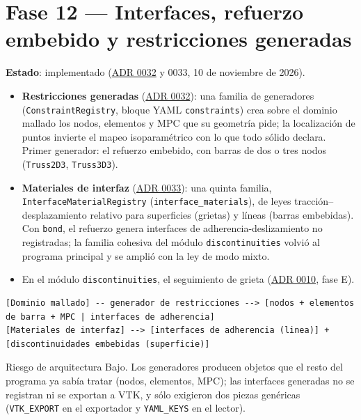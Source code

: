 \documentclass[11pt,oneside]{report}
\begin{document}
\section{Fase 12 --- Interfaces, refuerzo embebido y restricciones generadas}

\textbf{Estado}: implementado (\hyperref[adr:0032]{ADR 0032} y 0033, 10 de noviembre de 2026).

\begin{itemize}
  \item \textbf{Restricciones generadas} (\hyperref[adr:0032]{ADR 0032}): una familia de generadores (\texttt{ConstraintRegistry}, bloque YAML \texttt{constraints}) crea sobre el dominio mallado los nodos, elementos y MPC que su geometría pide; la localización de puntos invierte el mapeo isoparamétrico con lo que todo sólido declara. Primer generador: el refuerzo embebido, con barras de dos o tres nodos (\texttt{Truss2D3}, \texttt{Truss3D3}).
  \item \textbf{Materiales de interfaz} (\hyperref[adr:0033]{ADR 0033}): una quinta familia, \texttt{InterfaceMaterialRegistry} (\texttt{interface\_\allowbreak{}materials}), de leyes tracción--desplazamiento relativo para superficies (grietas) y líneas (barras embebidas). Con \texttt{bond}, el refuerzo genera interfaces de adherencia-deslizamiento no registradas; la familia cohesiva del módulo \texttt{discontinuities} volvió al programa principal y se amplió con la ley de modo mixto.
  \item En el módulo \texttt{discontinuities}, el seguimiento de grieta (\hyperref[adr:0010]{ADR 0010}, fase E).
\end{itemize}

\begin{lstlisting}
[Dominio mallado] -- generador de restricciones --> [nodos + elementos de barra + MPC | interfaces de adherencia]
[Materiales de interfaz] --> [interfaces de adherencia (linea)] + [discontinuidades embebidas (superficie)]

\end{lstlisting}

\begin{infobox}{Riesgo de arquitectura}
Bajo. Los generadores producen objetos que el resto del programa ya sabía tratar (nodos, elementos, MPC); las interfaces generadas no se registran ni se exportan a VTK, y sólo exigieron dos piezas genéricas (\texttt{VTK\_EXPORT} en el exportador y \texttt{YAML\_KEYS} en el lector).
\end{infobox}
\end{document}
